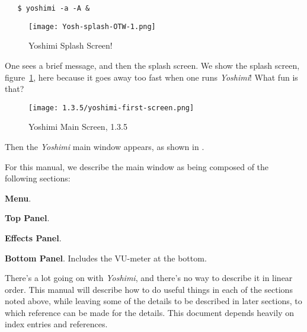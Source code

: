 \documentclass[
 11pt,
 twoside,
 a4paper,
 headinclude,
 footinclude,
 final                                 %
]{article}
\begin{document}
\begin{verbatim}
   $ yoshimi -a -A &
\end{verbatim}

\begin{figure}[H]
   \centering 
   \texttt{[image: Yosh-splash-OTW-1.png]}
   \caption{Yoshimi Splash Screen!}
   \label{fig:yoshimi_splash_screen}
\end{figure}

   One sees a brief message, and then the splash screen.
   We show the splash screen, figure~\ref{fig:yoshimi_splash_screen},
   here because it goes away too
   fast when one runs \textsl{Yoshimi}!
   What fun is that?

\begin{figure}[H]
   \centering 
   \texttt{[image: 1.3.5/yoshimi-first-screen.png]}
   \caption{Yoshimi Main Screen, 1.3.5}
   \label{fig:yoshimi_main_screen}
\end{figure}

   
   Then the \textsl{Yoshimi} main window appears, as shown in
   .

   For this manual, we describe the main window as being composed of
   the following sections:

\begin{enumber}
   \item \textbf{Menu}.
   \item \textbf{Top Panel}.
   \item \textbf{Effects Panel}.
   \item \textbf{Bottom Panel}.  Includes the VU-meter at the bottom.
\end{enumber}

There's a lot going on with \textsl{Yoshimi}, and there's no way
to describe it in linear order.  This manual will describe how to do useful
things in each of the sections noted above, while leaving some of the
details to be described in later sections, to which reference can be made
for the details.  This document depends heavily on index entries and
references.






\end{document}
